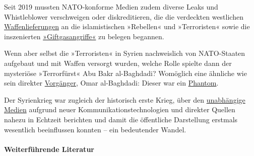 Seit 2019 mussten NATO-konforme Medien zudem diverse Leaks und
Whistleblower verschweigen oder diskreditieren, die die verdeckten
westlichen
\href{https://armswatch.com/350-diplomatic-flights-carry-weapons-for-terrorists/}{Waffen­lieferungen}
an die islamistischen »Rebellen« und »Terroristen« sowie die
inszenierten
\href{https://thegrayzone.com/2020/02/11/new-leaks-shatter-opcws-attacks-douma-whistleblowers/}{»Giftgasangriffe«}
zu belegen begannen.

Wenn aber selbst die »Terroristen« in Syrien nachweislich von
NATO-Staaten aufgebaut und mit Waffen versorgt wurden, welche Rolle
spielte dann der mysteriöse »Terrorfürst« Abu Bakr al-Baghdadi?
Womöglich eine ähnliche wie sein direkter
\href{https://en.wikipedia.org/wiki/Abu_Omar_al-Baghdadi}{Vorgänger},
Omar al-Baghdadi: Dieser war ein
\href{https://www.nytimes.com/2007/07/18/world/africa/18iht-iraq.4.6718200.html}{Phantom}.

Der Syrienkrieg war zugleich der historisch erste Krieg, über den
\href{https://swprs.org/media-navigator/}{unabhängige Medien} aufgrund
neuer Kommunikationstechnologien und direkter Quellen nahezu in Echtzeit
berichten und damit die öffentliche Darstellung erstmals wesentlich
beeinflussen konnten -- ein bedeutender Wandel.

\hypertarget{weiterfuxfchrende-literatur}{%
\paragraph{Weiterführende Literatur}\label{weiterfuxfchrende-literatur}}

